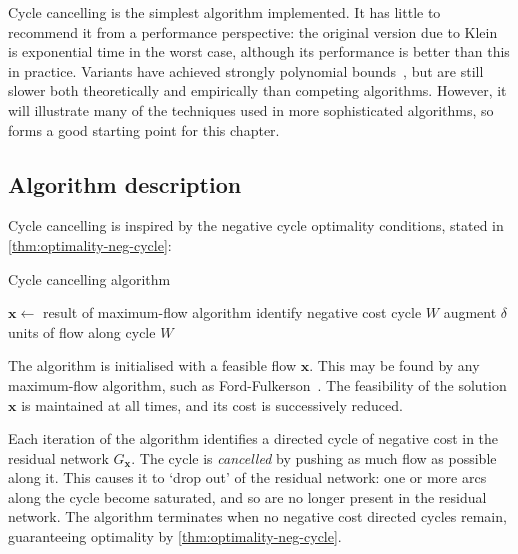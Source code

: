 Cycle cancelling is the simplest algorithm implemented. It has little to recommend it from a performance perspective: the original version due to Klein~\cite{Klein:1967} is exponential time in the worst case, although its performance is better than this in practice. Variants have achieved strongly polynomial bounds~\cite{Goldberg:1989,Sokkalingam:2000}, but are still slower both theoretically and empirically than competing algorithms. However, it will illustrate many of the techniques used in more sophisticated algorithms, so forms a good starting point for this chapter.

\subsection{Algorithm description}

Cycle cancelling is inspired by the negative cycle optimality conditions, stated in \cref{thm:optimality-neg-cycle}:\\

\optimalitynegcycle*

\begin{algorithm}
    \caption{Cycle cancelling algorithm}
    \label{algo:cycle-cancelling}
    \begin{algorithmic}[1]
        \State $\mathbf{x}\gets $ result of maximum-flow algorithm 
        \State identify negative cost cycle $W$ 
        \State augment $\delta$ units of flow along cycle $W$
        \EndWhile{}
    \end{algorithmic}
\end{algorithm}

The algorithm is initialised with a feasible flow $\mathbf{x}$. This may be found by any maximum-flow algorithm, such as Ford-Fulkerson~\cite{FordFulkerson:1956}. The feasibility of the solution $\mathbf{x}$ is maintained at all times, and its cost is successively reduced. 

Each iteration of the algorithm identifies a directed cycle of negative cost in the residual network $G_\mathbf{x}$. The cycle is \emph{cancelled} by pushing as much flow as possible along it. This causes it to `drop out' of the residual network: one or more arcs along the cycle become saturated, and so are no longer present in the residual network. The algorithm terminates when no negative cost directed cycles remain, guaranteeing optimality by \cref{thm:optimality-neg-cycle}.

